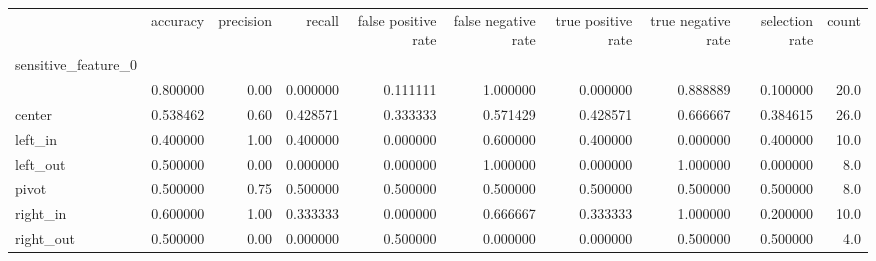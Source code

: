 \begin{tabular}{lrrrrrrrrr}
\toprule
{} &  accuracy &  precision &    recall &  false positive rate &  false negative rate &  true positive rate &  true negative rate &  selection rate &  count \\
sensitive\_feature\_0 &           &            &           &                      &                      &                     &                     &                 &        \\
\midrule
                    &  0.800000 &       0.00 &  0.000000 &             0.111111 &             1.000000 &            0.000000 &            0.888889 &        0.100000 &   20.0 \\
center              &  0.538462 &       0.60 &  0.428571 &             0.333333 &             0.571429 &            0.428571 &            0.666667 &        0.384615 &   26.0 \\
left\_in             &  0.400000 &       1.00 &  0.400000 &             0.000000 &             0.600000 &            0.400000 &            0.000000 &        0.400000 &   10.0 \\
left\_out            &  0.500000 &       0.00 &  0.000000 &             0.000000 &             1.000000 &            0.000000 &            1.000000 &        0.000000 &    8.0 \\
pivot               &  0.500000 &       0.75 &  0.500000 &             0.500000 &             0.500000 &            0.500000 &            0.500000 &        0.500000 &    8.0 \\
right\_in            &  0.600000 &       1.00 &  0.333333 &             0.000000 &             0.666667 &            0.333333 &            1.000000 &        0.200000 &   10.0 \\
right\_out           &  0.500000 &       0.00 &  0.000000 &             0.500000 &             0.000000 &            0.000000 &            0.500000 &        0.500000 &    4.0 \\
\bottomrule
\end{tabular}
